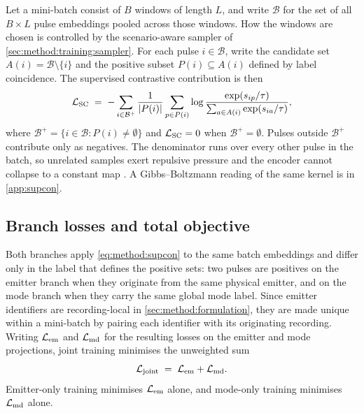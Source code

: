 Let a mini-batch consist of $B$ windows of length $L$, and write $\mathcal{B}$ for the set of all $B \times L$ pulse embeddings pooled across those windows.
How the windows are chosen is controlled by the scenario-aware sampler of \cref{sec:method:training:sampler}.
For each pulse $i \in \mathcal{B}$, write the candidate set $A(i) = \mathcal{B} \setminus \{i\}$ and the positive subset $P(i) \subseteq A(i)$ defined by label coincidence.
The supervised contrastive contribution \parencite{khosla2020supcon} is then
\begin{equation}\label{eq:method:supcon}
  \mathcal{L}_{\mathrm{SC}}
  \;=\;
  -\sum_{i \in \mathcal{B}^{+}} \frac{1}{\lvert P(i) \rvert}
  \sum_{p \in P(i)}
  \log \frac{\exp(s_{ip}/\tau)}{\sum_{a \in A(i)} \exp(s_{ia}/\tau)},
\end{equation}
where $\mathcal{B}^{+} = \{i \in \mathcal{B} : P(i) \neq \emptyset\}$ and $\mathcal{L}_{\mathrm{SC}} = 0$ when $\mathcal{B}^{+} = \emptyset$.
Pulses outside $\mathcal{B}^{+}$ contribute only as negatives.
The denominator runs over every other pulse in the batch, so unrelated samples exert repulsive pressure and the encoder cannot collapse to a constant map \parencite{chen2020simclr}.
A Gibbs--Boltzmann reading of the same kernel is in \cref{app:supcon}.

\subsection*{Branch losses and total objective}

Both branches apply \cref{eq:method:supcon} to the same batch embeddings and differ only in the label that defines the positive sets: two pulses are positives on the emitter branch when they originate from the same physical emitter, and on the mode branch when they carry the same global mode label.
Since emitter identifiers are recording-local in \cref{sec:method:formulation}, they are made unique within a mini-batch by pairing each identifier with its originating recording.
Writing $\mathcal{L}_{\mathrm{em}}$ and $\mathcal{L}_{\mathrm{md}}$ for the resulting losses on the emitter and mode projections, joint training minimises the unweighted sum
\begin{equation}\label{eq:method:loss_total}
  \mathcal{L}_{\mathrm{joint}} \;=\; \mathcal{L}_{\mathrm{em}} + \mathcal{L}_{\mathrm{md}}.
\end{equation}
Emitter-only training minimises $\mathcal{L}_{\mathrm{em}}$ alone, and mode-only training minimises $\mathcal{L}_{\mathrm{md}}$ alone.